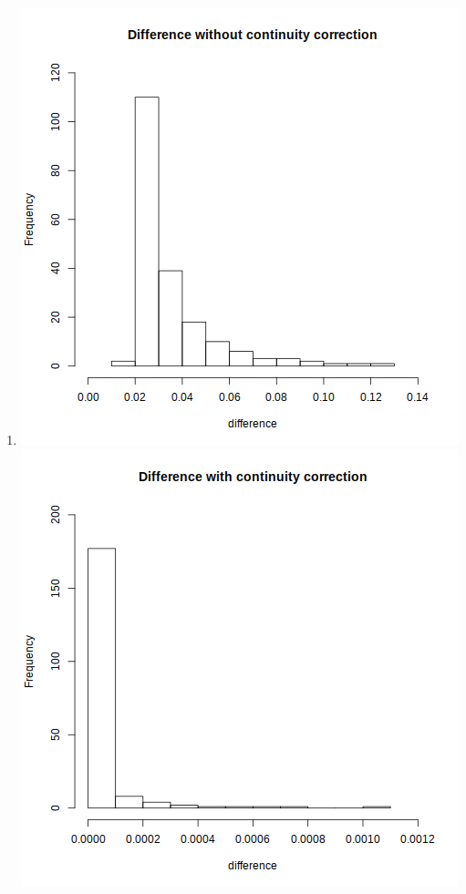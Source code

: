 \documentclass[12pt,letterpaper]{article}
\begin{document}
\begin{enumerate}
\begin{enumerate}
        \item
          \includegraphics[width=\linewidth/2-10pt]{prob3b1.png}
          \includegraphics[width=\linewidth/2-10pt]{prob3b2.png}


\end{enumerate}
\end{enumerate}
\end{document}
